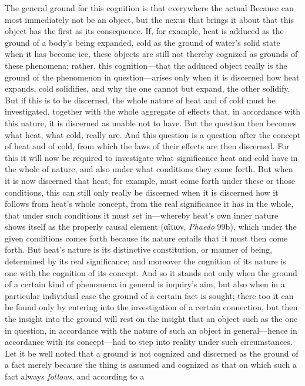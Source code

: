 \documentclass[12pt,a4paper]{book}
\begin{document}
The general ground for this cognition is that everywhere the actual Because can
most immediately not be an object, but the nexus that brings it about that this
object has the first as its consequence. If, for example, heat is adduced as the
ground of a body's being expanded, cold as the ground of water's solid state when
it has become ice, these objects are still not thereby cognized as grounds of these
phenomena; rather, this cognition---that the adduced object really is the ground of
the phenomenon in question---arises only when it is discerned how heat expands, cold
solidifies, and why the one cannot but expand, the other solidify. But if this is to
be discerned, the whole nature of heat and of cold must be investigated, together
with the whole aggregate of effects that, in accordance with this nature, it is
discerned as unable not to have. But the question then becomes what heat, what cold,
really are. And this question is a question after the concept of heat and of cold,
from which the laws of their effects are then discerned. For this it will now be
required to investigate what significance heat and cold have in the whole of nature,
and also under what conditions they come forth. But when it is now discerned that
heat, for example, must come forth under these or those conditions, this can still
only really be discerned when it is discerned how it follows from heat's whole
concept, from the real significance it has in the whole, that under such conditions
it must set in---whereby heat's own inner nature shows itself as the properly causal
element (αἴτιον, \textit{Phaedo} 99b), which under the given conditions comes forth
because its nature entails that it must then come forth. But heat's nature is its
distinctive constitution, or manner of being, determined by its real significance;
and moreover the cognition of its nature is one with the cognition of its concept.
And so it stands not only when the ground of a certain kind of phenomena in general
is inquiry's aim, but also when in a particular individual case the ground of a
certain fact is sought; there too it can be found only by entering into the
investigation of a certain connection, but then the insight into the ground will
rest on the insight that an object such as the one in question, in accordance with
the nature of such an object in general---hence in accordance with its concept---had
to step into reality under such circumstances. Let it be well noted that a ground is
not cognized and discerned as the ground of a fact merely because the thing is
assumed and cognized as that on which such a fact always \emph{follows}, and according to a
\end{document}
